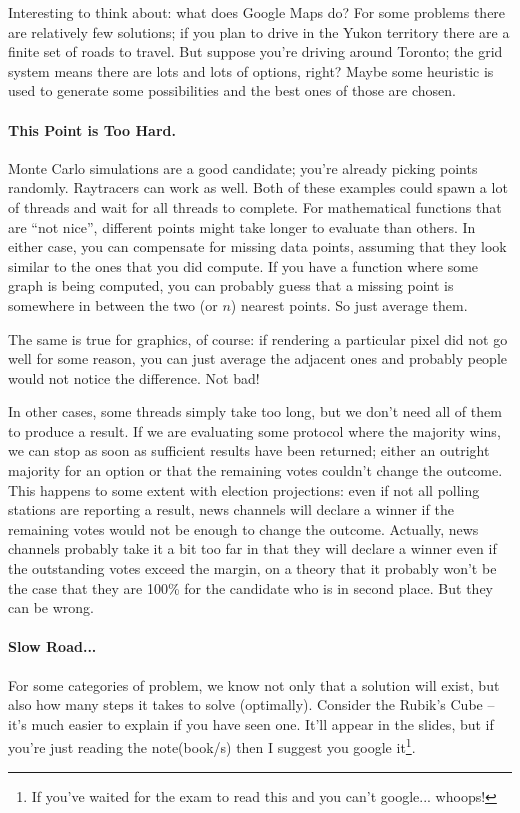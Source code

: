 \documentclass[a4paper]{report}
\begin{document}
Interesting to think about: what does Google Maps do? For some problems there are relatively few solutions; if you plan to drive in the Yukon territory there are a finite set of roads to travel. But suppose you're driving around Toronto; the grid system means there are lots and lots of options, right? Maybe some heuristic is used to generate some possibilities and the best ones of those are chosen.


\paragraph{This Point is Too Hard.} Monte Carlo simulations
are a good candidate; you're already picking points randomly.
Raytracers can work as well. Both of these examples could spawn a lot
of threads and wait for all threads to complete. For mathematical functions that are ``not nice'', different points might take longer to evaluate than others. 
In either case, you
can compensate for missing data points, assuming that they look similar to
the ones that you did compute. If you have a function where some graph is being
computed, you can probably guess that a missing point is somewhere in between the two (or $n$) nearest points. So just average them.

The same is true for graphics, of course: if rendering a particular pixel did
not go well for some reason, you can just average the adjacent ones and probably
people would not notice the difference. Not bad!

In other cases, some threads simply take too long, but we don't need all of them to produce a result. If we are evaluating some protocol where the majority wins, we can stop as soon as sufficient results have been returned; either an outright majority for an option or that the remaining votes couldn't change the outcome. This happens to some extent with election projections: even if not all polling stations are reporting a result, news channels will declare a winner if the remaining votes would not be enough to change the outcome. Actually, news channels probably take it a bit too far in that they will declare a winner even if the outstanding votes exceed the margin, on a theory that it probably won't be the case that they are 100\% for the candidate who is in second place. But they can be wrong.

\paragraph{Slow Road...}
For some categories of problem, we know not only that a solution will exist, but also how many steps it takes to solve (optimally). Consider the Rubik's Cube -- it's much easier to explain if you have seen one. It'll appear in the slides, but if you're just reading the note(book/s) then I suggest you google it\footnote{If you've waited for the exam to read this and you can't google... whoops!}.
\end{document}
